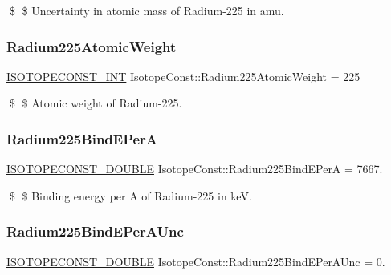 \$ \$ Uncertainty in atomic mass of Radium-\/225 in amu. \mbox{\label{group___isotope_const-_radium-_ra225_gaeafa217f0c04afd10711a221abee6bfe}} 
\subsubsection{\texorpdfstring{Radium225\+Atomic\+Weight}{Radium225AtomicWeight}}
{\footnotesize\ttfamily \mbox{\hyperlink{group___isotope_const-_macros_ga5f18360b3e99483a35c32d789e62621c}{I\+S\+O\+T\+O\+P\+E\+C\+O\+N\+S\+T\+\_\+\+I\+NT}} Isotope\+Const\+::\+Radium225\+Atomic\+Weight = 225}

\$ \$ Atomic weight of Radium-\/225. \mbox{\label{group___isotope_const-_radium-_ra225_ga06400fe893b6262843ade772ebdd36cd}} 
\subsubsection{\texorpdfstring{Radium225\+Bind\+E\+PerA}{Radium225BindEPerA}}
{\footnotesize\ttfamily \mbox{\hyperlink{group___isotope_const-_macros_ga8f45a7272ce02c0b4c65c44636ed719a}{I\+S\+O\+T\+O\+P\+E\+C\+O\+N\+S\+T\+\_\+\+D\+O\+U\+B\+LE}} Isotope\+Const\+::\+Radium225\+Bind\+E\+PerA = 7667.}

\$ \$ Binding energy per A of Radium-\/225 in keV. \mbox{\label{group___isotope_const-_radium-_ra225_ga369e5c323f580bf002f479d2cc110436}} 
\subsubsection{\texorpdfstring{Radium225\+Bind\+E\+Per\+A\+Unc}{Radium225BindEPerAUnc}}
{\footnotesize\ttfamily \mbox{\hyperlink{group___isotope_const-_macros_ga8f45a7272ce02c0b4c65c44636ed719a}{I\+S\+O\+T\+O\+P\+E\+C\+O\+N\+S\+T\+\_\+\+D\+O\+U\+B\+LE}} Isotope\+Const\+::\+Radium225\+Bind\+E\+Per\+A\+Unc = 0.}

